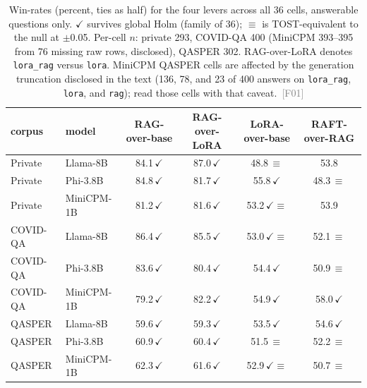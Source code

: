 \documentclass[11pt]{article}
\newcommand{\rcpt}[1]{\textcolor{gray}{\,\textsf{\scriptsize[#1]}}}
\begin{document}
\begin{table}[tbp]
  \centering
  \small
  \caption{Win-rates (percent, ties as half) for the four levers across all 36 cells, answerable questions only. $\checkmark$ survives global Holm (family of 36); $\equiv$ is TOST-equivalent to the null at $\pm$0.05. Per-cell $n$: private 293, COVID-QA 400 (MiniCPM 393--395 from 76 missing raw rows, disclosed), QASPER 302. RAG-over-LoRA denotes \texttt{lora\_rag} versus \texttt{lora}. MiniCPM QASPER cells are affected by the generation truncation disclosed in the text (136, 78, and 23 of 400 answers on \texttt{lora\_rag}, \texttt{lora}, and \texttt{rag}); read those cells with that caveat. \rcpt{F01}}
  \label{tab:levers}
  \begin{tabular}{llcccc}
    \toprule
    corpus & model & RAG-over-base & RAG-over-LoRA & LoRA-over-base & RAFT-over-RAG \\
    \midrule
    Private  & Llama-8B   & 84.1\,$\checkmark$ & 87.0\,$\checkmark$ & 48.8\,$\equiv$ & 53.8 \\
    Private  & Phi-3.8B   & 84.8\,$\checkmark$ & 81.7\,$\checkmark$ & 55.8\,$\checkmark$ & 48.3\,$\equiv$ \\
    Private  & MiniCPM-1B & 81.2\,$\checkmark$ & 81.6\,$\checkmark$ & 53.2\,$\checkmark\equiv$ & 53.9 \\
    COVID-QA & Llama-8B   & 86.4\,$\checkmark$ & 85.5\,$\checkmark$ & 53.0\,$\checkmark\equiv$ & 52.1\,$\equiv$ \\
    COVID-QA & Phi-3.8B   & 83.6\,$\checkmark$ & 80.4\,$\checkmark$ & 54.4\,$\checkmark$ & 50.9\,$\equiv$ \\
    COVID-QA & MiniCPM-1B & 79.2\,$\checkmark$ & 82.2\,$\checkmark$ & 54.9\,$\checkmark$ & 58.0\,$\checkmark$ \\
    QASPER   & Llama-8B   & 59.6\,$\checkmark$ & 59.3\,$\checkmark$ & 53.5\,$\checkmark$ & 54.6\,$\checkmark$ \\
    QASPER   & Phi-3.8B   & 60.9\,$\checkmark$ & 60.4\,$\checkmark$ & 51.5\,$\equiv$ & 52.2\,$\equiv$ \\
    QASPER   & MiniCPM-1B & 62.3\,$\checkmark$ & 61.6\,$\checkmark$ & 52.9\,$\checkmark\equiv$ & 50.7\,$\equiv$ \\
    \bottomrule
  \end{tabular}
\end{table}
\end{document}
